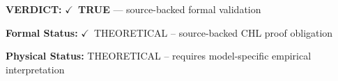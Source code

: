 \textbf{VERDICT:} \ensuremath{\checkmark}\ \textbf{TRUE} --- source-backed formal validation

\textbf{Formal Status:} \ensuremath{\checkmark}\ THEORETICAL -- source-backed CHL proof obligation

\textbf{Physical Status:} THEORETICAL -- requires model-specific empirical interpretation
\par\vspace{0.45em}
\par
\ifTZPDarkEdition
{}
\fi
\endgroup
\endgroup
